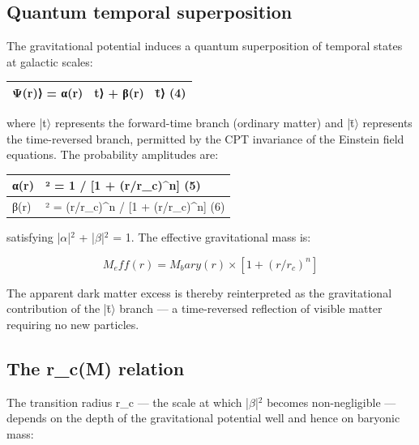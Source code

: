 \documentclass[a4paper,fleqn,usenatbib]{mnras}
\begin{document}
\subsection{Quantum temporal superposition}\label{sec:2-3-quantum-temporal-superposition}

The gravitational potential induces a quantum superposition of temporal states at galactic scales:

\begin{table}
\centering
\begin{tabular}{lll}
\hline
Ψ(r)⟩ = α(r) & t⟩ + β(r) & t̄⟩                               (4) \\
\hline
\hline
\end{tabular}
\end{table}

where |t$\rangle$ represents the forward-time branch (ordinary matter) and |t̄$\rangle$ represents the time-reversed branch, permitted by the CPT invariance of the Einstein field equations. The probability amplitudes are:

\begin{table}
\centering
\begin{tabular}{ll}
\hline
α(r) & ² = 1 / [1 + (r/r\_c)\^{}n]                               (5) \\
\hline
β(r) & ² = (r/r\_c)\^{}n / [1 + (r/r\_c)\^{}n]                      (6) \\
\hline
\end{tabular}
\end{table}

satisfying |$\alpha$|$^{2}$ + |$\beta$|$^{2}$ = 1. The effective gravitational mass is:

\begin{equation}\label{eq:7}
  M_eff(r) = M_bary(r) \times [1 + (r/r_c)^n]
\end{equation}

The apparent dark matter excess is thereby reinterpreted as the gravitational contribution of the |t̄$\rangle$ branch — a time-reversed reflection of visible matter requiring no new particles.


\subsection{The r\_c(M) relation}\label{sec:2-4-the-r-c-m-relation}

The transition radius r_c — the scale at which |$\beta$|$^{2}$ becomes non-negligible — depends on the depth of the gravitational potential well and hence on baryonic mass:
\end{document}
